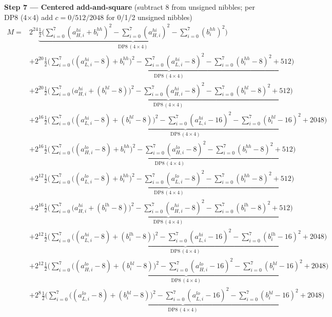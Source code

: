 \documentclass[fleqn]{article}
\newcommand{\DPop}[3]{\mathrm{DP#1}\,(#2\!\times\!#3)}
\begin{document}
\textbf{Step 7 --- Centered add-and-square}\quad
{\small(subtract $8$ from unsigned nibbles; per DP8 (4$\times$4) add $c=0/512/2048$ for 0/1/2 unsigned nibbles)}
\begin{align*}
M = {}
  & 2^{24}\underbrace{\tfrac12\Big(\sum_{i=0}^{7}(a_{H,i}^{hi}{+}b_i^{hh})^2 - \sum_{i=0}^{7}(a_{H,i}^{hi})^2 - \sum_{i=0}^{7}(b_i^{hh})^2\Big)}_{\DPop{8}{4}{4}} \\[0.5em]
  & + 2^{20}\underbrace{\tfrac12\Big(\sum_{i=0}^{7}\big((a_{L,i}^{hi}{-}8){+}b_i^{hh}\big)^2 - \sum_{i=0}^{7}(a_{L,i}^{hi}{-}8)^2 - \sum_{i=0}^{7}(b_i^{hh}{-}8)^2 + 512\Big)}_{\DPop{8}{4}{4}} \\[0.5em]
  & + 2^{20}\underbrace{\tfrac12\Big(\sum_{i=0}^{7}\big(a_{H,i}^{hi}{+}(b_i^{hl}{-}8)\big)^2 - \sum_{i=0}^{7}(a_{H,i}^{hi}{-}8)^2 - \sum_{i=0}^{7}(b_i^{hl}{-}8)^2 + 512\Big)}_{\DPop{8}{4}{4}} \\[0.5em]
  & + 2^{16}\underbrace{\tfrac12\Big(\sum_{i=0}^{7}\big((a_{L,i}^{hi}{-}8){+}(b_i^{hl}{-}8)\big)^2 - \sum_{i=0}^{7}(a_{L,i}^{hi}{-}16)^2 - \sum_{i=0}^{7}(b_i^{hl}{-}16)^2 + 2048\Big)}_{\DPop{8}{4}{4}} \\[0.5em]
  & + 2^{16}\underbrace{\tfrac12\Big(\sum_{i=0}^{7}\big((a_{H,i}^{lo}{-}8){+}b_i^{hh}\big)^2 - \sum_{i=0}^{7}(a_{H,i}^{lo}{-}8)^2 - \sum_{i=0}^{7}(b_i^{hh}{-}8)^2 + 512\Big)}_{\DPop{8}{4}{4}} \\[0.5em]
  & + 2^{12}\underbrace{\tfrac12\Big(\sum_{i=0}^{7}\big((a_{L,i}^{lo}{-}8){+}b_i^{hh}\big)^2 - \sum_{i=0}^{7}(a_{L,i}^{lo}{-}8)^2 - \sum_{i=0}^{7}(b_i^{hh}{-}8)^2 + 512\Big)}_{\DPop{8}{4}{4}} \\[0.5em]
  & + 2^{16}\underbrace{\tfrac12\Big(\sum_{i=0}^{7}\big(a_{H,i}^{hi}{+}(b_i^{lh}{-}8)\big)^2 - \sum_{i=0}^{7}(a_{H,i}^{hi}{-}8)^2 - \sum_{i=0}^{7}(b_i^{lh}{-}8)^2 + 512\Big)}_{\DPop{8}{4}{4}} \\[0.5em]
  & + 2^{12}\underbrace{\tfrac12\Big(\sum_{i=0}^{7}\big((a_{L,i}^{hi}{-}8){+}(b_i^{lh}{-}8)\big)^2 - \sum_{i=0}^{7}(a_{L,i}^{hi}{-}16)^2 - \sum_{i=0}^{7}(b_i^{lh}{-}16)^2 + 2048\Big)}_{\DPop{8}{4}{4}} \\[0.5em]
  & + 2^{12}\underbrace{\tfrac12\Big(\sum_{i=0}^{7}\big((a_{H,i}^{lo}{-}8){+}(b_i^{hl}{-}8)\big)^2 - \sum_{i=0}^{7}(a_{H,i}^{lo}{-}16)^2 - \sum_{i=0}^{7}(b_i^{hl}{-}16)^2 + 2048\Big)}_{\DPop{8}{4}{4}} \\[0.5em]
  & + 2^{8}\underbrace{\tfrac12\Big(\sum_{i=0}^{7}\big((a_{L,i}^{lo}{-}8){+}(b_i^{hl}{-}8)\big)^2 - \sum_{i=0}^{7}(a_{L,i}^{lo}{-}16)^2 - \sum_{i=0}^{7}(b_i^{hl}{-}16)^2 + 2048\Big)}_{\DPop{8}{4}{4}} \\[0.5em]

\end{align*}
\end{document}
